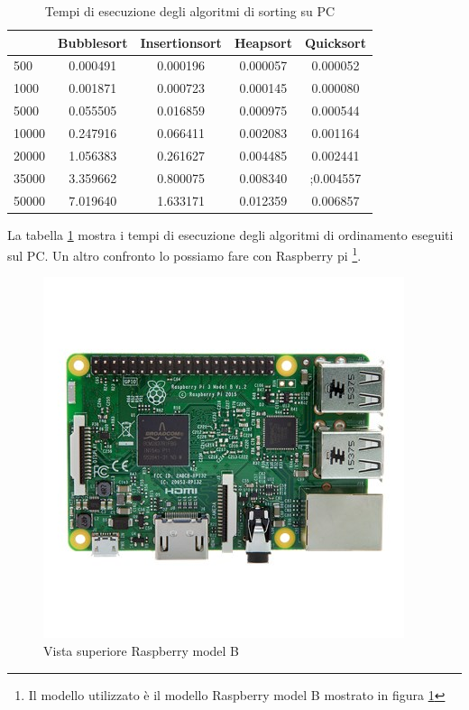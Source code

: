 \documentclass[12pt,a4paper]{report}
\begin{document}
	
	\begin{table}[h]
		\centering
		\begin{tabular}		{| l | c | c | c | c |}
		\hline
		      & Bubblesort & Insertionsort & Heapsort & Quicksort \\ \hline
500   & 0.000491      & 0.000196      & 0.000057 & 0.000052     \\ \hline
1000  & 0.001871	    & 0.000723      & 0.000145 & 0.000080     \\ \hline
5000  & 0.055505      & 0.016859     & 0.000975  & 0.000544   \\ \hline
10000 & 0.247916      & 0.066411     & 0.002083 & 0.001164     \\ \hline
20000 & 1.056383   & 0.261627      & 0.004485  & 0.002441   \\ \hline
35000 & 3.359662     & 0.800075     & 0.008340  & ;0.004557   \\ \hline
50000 & 7.019640     & 1.633171   & 0.012359  & 0.006857  \\ \hline

		\end{tabular}
		\caption{Tempi di esecuzione degli algoritmi di sorting su PC}
		\label{Fig:PcSort}
	\end{table}

La tabella \ref{Fig:PcSort} mostra i tempi di esecuzione degli algoritmi di ordinamento eseguiti sul PC. 
Un altro confronto lo possiamo fare con Raspberry pi \footnote{Il modello utilizzato è il modello Raspberry model B mostrato in figura \ref{fig:RaspberryB} }.

\begin{figure}[h]
\centering
	\includegraphics[scale=0.5 ]{RBTop.jpeg}
	\caption{Vista superiore Raspberry model B}
	\label{fig:RaspberryB}
\end{figure}
\end{document}
